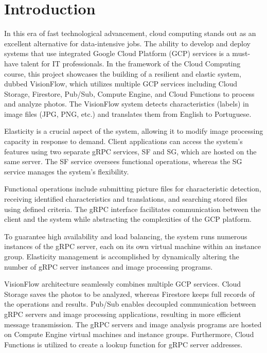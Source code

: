 \chapter{Introduction}\label{ch:introduction}

In this era of fast technological advancement, cloud computing stands out as an excellent alternative for data-intensive jobs. The ability to develop and deploy systems that use integrated Google Cloud Platform (GCP) services is a must-have talent for IT professionals. In the framework of the Cloud Computing course, this project showcases the building of a resilient and elastic system, dubbed VisionFlow, which utilizes multiple GCP services including Cloud Storage, Firestore, Pub/Sub, Compute Engine, and Cloud Functions to process and analyze photos. The VisionFlow system detects characteristics (labels) in image files (JPG, PNG, etc.) and translates them from English to Portuguese.

Elasticity is a crucial aspect of the system, allowing it to modify image processing capacity in response to demand. Client applications can access the system's features using two separate gRPC services, SF and SG, which are hosted on the same server. The SF service oversees functional operations, whereas the SG service manages the system's flexibility.

Functional operations include submitting picture files for characteristic detection, receiving identified characteristics and translations, and searching stored files using defined criteria. The gRPC interface facilitates communication between the client and the system while abstracting the complexities of the GCP platform.

To guarantee high availability and load balancing, the system runs numerous instances of the gRPC server, each on its own virtual machine within an instance group. Elasticity management is accomplished by dynamically altering the number of gRPC server instances and image processing programs.

VisionFlow architecture seamlessly combines multiple GCP services. Cloud Storage saves the photos to be analyzed, whereas Firestore keeps full records of the operations and results. Pub/Sub enables decoupled communication between gRPC servers and image processing applications, resulting in more efficient message transmission. The gRPC servers and image analysis programs are hosted on Compute Engine virtual machines and instance groups. Furthermore, Cloud Functions is utilized to create a lookup function for gRPC server addresses.

